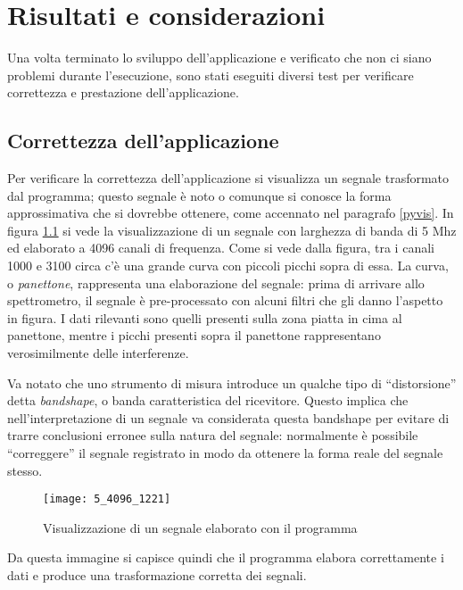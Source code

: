 \chapter{Risultati e considerazioni}
\label{tests}
Una volta terminato lo sviluppo dell'applicazione e verificato che non ci siano
problemi durante l'esecuzione, sono stati eseguiti diversi test per verificare
correttezza e prestazione dell'applicazione.

\section{Correttezza dell'applicazione}
Per verificare la correttezza dell'applicazione si visualizza un segnale
trasformato dal programma; questo segnale \`e noto o comunque si conosce la
forma approssimativa che si dovrebbe ottenere, come accennato nel paragrafo
\ref{pyvis}. In figura \ref{fig:correctness} si vede la visualizzazione di un
segnale con larghezza di banda di 5 Mhz ed elaborato a 4096 canali di frequenza.
Come si vede dalla figura, tra i canali 1000 e 3100 circa c'\`e una grande curva
con piccoli picchi sopra di essa. La curva, o \emph{panettone}, rappresenta una
elaborazione del segnale: prima di arrivare allo spettrometro, il segnale \`e
pre-processato con alcuni filtri che gli danno l'aspetto in figura. I dati
rilevanti sono quelli presenti sulla zona piatta in cima al panettone, mentre i
picchi presenti sopra il panettone rappresentano verosimilmente delle
interferenze.

Va notato che uno strumento di misura introduce un qualche tipo di
``distorsione'' detta \emph{bandshape}, o banda caratteristica del ricevitore.
Questo implica che nell'interpretazione di un segnale va considerata questa
bandshape per evitare di trarre conclusioni erronee sulla natura del segnale:
normalmente \`e possibile ``correggere'' il segnale registrato in modo da
ottenere la forma reale del segnale stesso.
\begin{figure}[htb]
	\begin{center}
		\texttt{[image: 5\_4096\_1221]}
	\end{center}
	\caption{Visualizzazione di un segnale elaborato con il programma}
	\label{fig:correctness}
\end{figure}

Da questa immagine si capisce quindi che il programma elabora correttamente i
dati e produce una trasformazione corretta dei segnali.

